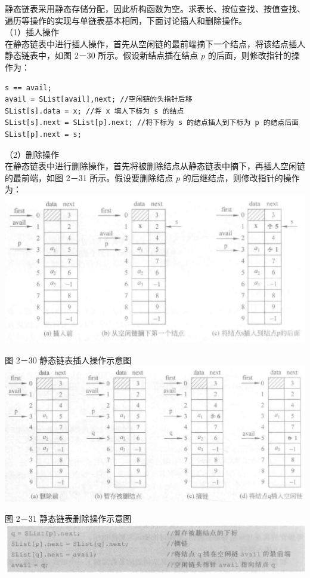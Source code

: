 \documentclass[10pt]{article}
\begin{document}
静态链表采用静态存储分配，因此析构函数为空。求表长、按位查找、按值查找、遍历等操作的实现与单链表基本相同，下面讨论插人和删除操作。\\
（1）插人操作\\
在静态链表中进行插人操作，首先从空闲链的最前端摘下一个结点，将该结点插人静态链表中，如图 2－30 所示。假设新结点插在结点 $p$ 的后面，则修改指针的操作为：

\begin{verbatim}
s == avail;
avail = SList[avail],next; //空闲链的头指针后移
SList[s].data = x; //将 x 填人下标为 s 的结点
SList[s].next = SList[p].next; //将下标为 s 的结点插人到下标为 p 的结点后面
SList[p].next = s;
\end{verbatim}

（2）删除操作\\
在静态链表中进行删除操作，首先将被删除结点从静态链表中摘下，再插人空闲链的最前端，如图 2－31 所示。假设要删除结点 $p$ 的后继结点，则修改指针的操作为：\\
\includegraphics[max width=\textwidth, center]{2025_06_06_704745ea57b15b2333e5g-067(1)}

图 2－30 静态链表插人操作示意图\\
\includegraphics[max width=\textwidth, center]{2025_06_06_704745ea57b15b2333e5g-067}

图 2－31 静态链表删除操作示意图\\
\includegraphics[max width=\textwidth, center]{2025_06_06_704745ea57b15b2333e5g-067(2)}
\end{document}
